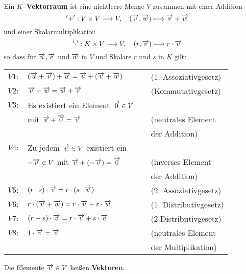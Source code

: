 \begin{definition} Ein \textbf{$K$--Vektorraum} ist eine 
nichtleere Menge $V$ zusammen mit einer Addition 
  	$$ '+': V \times V \longrightarrow V, \quad (\overrightarrow{v}, \overrightarrow{w}) 
     	\longmapsto \overrightarrow{v} + \overrightarrow{w} $$
und einer Skalarmultiplikation 
  	$$ '\cdot': K \times V \longrightarrow V, \quad (r, \overrightarrow{v}) 
     	\longmapsto r \cdot \overrightarrow{v} $$
so dass für $\overrightarrow{u}, \overrightarrow{v}$ und 
$\overrightarrow{w}$ in $V$ und Skalare $r$ und $s$ in $K$ gilt:

\begin{tabular} {l l c l}
$V1:$ & $\left(\overrightarrow{u} + \overrightarrow{v} \right) + \overrightarrow{w} = 
\overrightarrow{u} + \left(\overrightarrow{v} + \overrightarrow{w} \right)$ & $\,$ &
(1. Assoziativgesetz) \\
$V2:$ & $\overrightarrow{v} + \overrightarrow{w} = \overrightarrow{w} + 
\overrightarrow{v}$ & & (Kommutativgesetz) \\
$V3:$ & Es existiert ein Element $\overrightarrow{0} \in V$ & & \\
& mit  $\overrightarrow{v} + \overrightarrow{0} = \overrightarrow{v}$ & & (neutrales 
Element \\
& & & der Addition) \\
$V4:$ & Zu jedem $\overrightarrow{v} \in V$ existiert ein  
& & \\
& $-\overrightarrow{v} \in V$ mit $\overrightarrow{v} + (- \overrightarrow{v}) = \overrightarrow{0}$ & &
(inverses Element \\
& & & der Addition) \\
$V5:$ & $(r \cdot s) \cdot \overrightarrow{v} = r \cdot ( s \cdot \overrightarrow{v})$ 
& & (2. Assoziativgesetz) \\
$V6:$ & $r \cdot (\overrightarrow{v} + \overrightarrow{w}) = r \cdot 
\overrightarrow{v} + r \cdot \overrightarrow{w}$ & & (1. Distributivgesetz) \\
$V7:$ & $(r + s) \cdot \overrightarrow{v} = r \cdot \overrightarrow{v} + 
s \cdot \overrightarrow{v}$ & & (2.Distributivgesetz) \\
$V8:$ & $ 1 \cdot \overrightarrow{v} = \overrightarrow{v}$ & & (neutrales Element \\
& & & der Multiplikation)
\end{tabular}

Die Elemente $\overrightarrow{v} \in V$ heißen \textbf{Vektoren}.
\end{definition}


